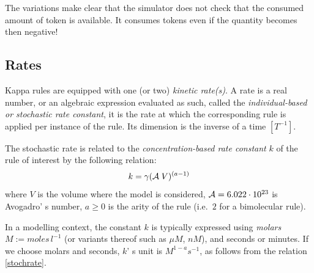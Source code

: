 \documentclass[11pt]{book}
\def\ga{\gamma}
\def\ie{i.e.~}
\def\mit#1{{\mathit #1}}
\begin{document}
The variations make clear that the simulator
does not check that the consumed amount of token is available. It
consumes tokens even if the quantity becomes then negative!

\subsection{Rates}\label{sec:kinetics}
Kappa rules are equipped with one (or two) \emph{kinetic rate(s)}. A rate is a real number, or an algebraic expression evaluated as such, called the \emph{individual-based or stochastic rate constant}, it is the rate at which the corresponding rule is applied per instance of the rule. Its dimension is the inverse of a time $[T^{-1}]$.

The stochastic rate is related to the \emph{concentration-based rate constant} $k$ of the rule of interest by the following relation:
%
%
\begin{equation}\label{stochrate}
k = \ga{({\cal A}\; V)^{(a-1)}} %
\end{equation}
where
$V$ is the volume where the model is considered,
${\cal A}= 6.022\cdot 10^{23}$ is Avogadro' s number, %
$a\geq0$ is the arity of the rule ({\ie}$2$ for a bimolecular rule).

In a modelling context, the constant $k$ is typically expressed using \emph{molars} $M:=\mit{moles}\,l^{-1}$ (or variants thereof such
as $\mu M$, $nM$), and seconds or minutes. If we choose molars and seconds, $k$' s unit is $\mathit{M}^{1-a}\mathit{s}^{-1}$, as
follows from the relation \ref{stochrate}.
\end{document}
